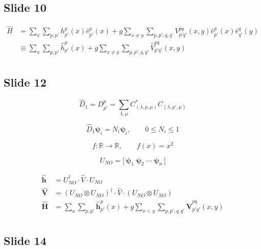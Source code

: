 \documentclass[a4paper,11pt]{article}
\begin{document}
\subsection*{Slide 10}

\begin{align}
  \hat{H} &= \sum_{x}\sum_{p, p'} h^{p}_{p'}(x) \hat{e}^{p}_{p'}(x) + g \sum_{x \ne y}\sum_{p, p', q, q'} V^{pq}_{p'q'}(x, y) \hat{e}^{p}_{p'}(x) \hat{e}^{q}_{q'}(y) \\
  &\equiv \sum_{x}\sum_{p, p'} \hat{h}^{p}_{p'}(x) + g \sum_{x \ne y}\sum_{p, p', q, q'} \hat{V}^{pq}_{p'q'}(x, y) \\
\end{align}


\subsection*{Slide 12}

\begin{equation}
\hat{D}_{1} = D^{p}_{p'} = \sum_{\lambda, \mu} C^*_{(\lambda, p, \mu)} C_{(\lambda, p', \mu)}
\end{equation}

\begin{equation}
\hat{D}_{1}\boldsymbol{\psi}_{i} = N_{i}\boldsymbol{\psi}_{i}, \qquad 0\le N_{i}\le 1
\end{equation}

\begin{equation}
f : \mathbb{R} \longrightarrow \mathbb{R}, \qquad f(x)=x^2
\end{equation}

\begin{equation}
U_{NO} = \bigl[\,\boldsymbol{\psi}_1\;\boldsymbol{\psi}_2\;\cdots\;\boldsymbol{\psi}_n\,\bigr]
\end{equation}

\begin{align}
\boldsymbol{\hat{h}} &= U_{NO}^{\dagger} \cdot \hat{V} \cdot U_{NO} \\
\boldsymbol{\hat{V}} &= (U_{NO} \otimes U_{NO})^{\dagger} \cdot \hat{V} \cdot (U_{NO} \otimes U_{NO}) \\
\boldsymbol{\hat{H}} &= \sum_{x}\sum_{p, p'} \boldsymbol{\hat{h}}^{p}_{p'}(x) + g \sum_{x<y}\sum_{p, p', q, q'} \boldsymbol{\hat{V}}^{pq}_{p'q'}(x, y) \\
\end{align}


\subsection*{Slide 14}
\end{document}
